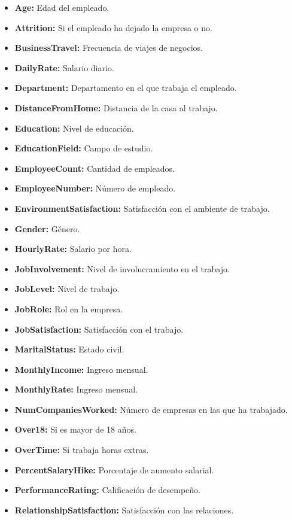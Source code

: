 \begin{itemize}
    \item \textbf{Age:} Edad del empleado.
    \item \textbf{Attrition:} Si el empleado ha dejado la empresa o no.
    \item \textbf{BusinessTravel:} Frecuencia de viajes de negocios.
    \item \textbf{DailyRate:} Salario diario.
    \item \textbf{Department:} Departamento en el que trabaja el empleado.
    \item \textbf{DistanceFromHome:} Distancia de la casa al trabajo.
    \item \textbf{Education:} Nivel de educación.
    \item \textbf{EducationField:} Campo de estudio.
    \item \textbf{EmployeeCount:} Cantidad de empleados.
    \item \textbf{EmployeeNumber:} Número de empleado.
    \item \textbf{EnvironmentSatisfaction:} Satisfacción con el ambiente de trabajo.
    \item \textbf{Gender:} Género.
    \item \textbf{HourlyRate:} Salario por hora.
    \item \textbf{JobInvolvement:} Nivel de involucramiento en el trabajo.
    \item \textbf{JobLevel:} Nivel de trabajo.
    \item \textbf{JobRole:} Rol en la empresa.
    \item \textbf{JobSatisfaction:} Satisfacción con el trabajo.
    \item \textbf{MaritalStatus:} Estado civil.
    \item \textbf{MonthlyIncome:} Ingreso mensual.
    \item \textbf{MonthlyRate:} Ingreso mensual.
    \item \textbf{NumCompaniesWorked:} Número de empresas en las que ha trabajado.
    \item \textbf{Over18:} Si es mayor de 18 años.
    \item \textbf{OverTime:} Si trabaja horas extras.
    \item \textbf{PercentSalaryHike:} Porcentaje de aumento salarial.
    \item \textbf{PerformanceRating:} Calificación de desempeño.
    \item \textbf{RelationshipSatisfaction:} Satisfacción con las relaciones.

\end{itemize}
